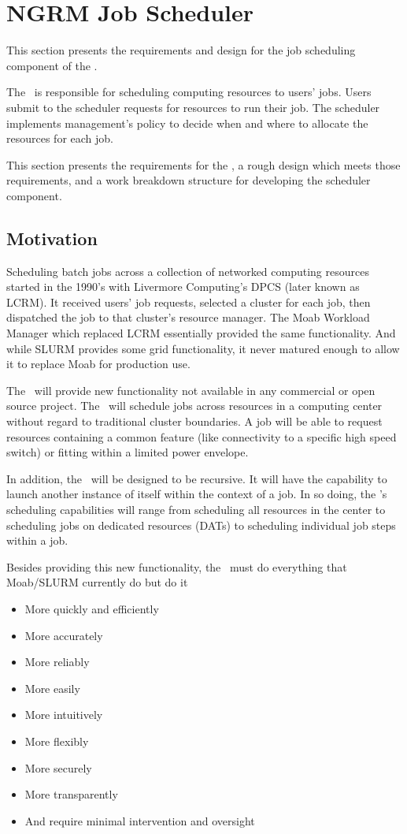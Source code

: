 \section{NGRM Job Scheduler}

This section presents the requirements and design for the job
scheduling component of the \ngrm.

The \ngjs\ is responsible for scheduling computing resources to users'
jobs.  Users submit to the scheduler requests for resources to run
their job.  The scheduler implements management's policy to decide
when and where to allocate the resources for each job.

This section presents the requirements for the \ngjs, a rough design
which meets those requirements, and a work breakdown structure for
developing the scheduler component.

\subsection{Motivation}

Scheduling batch jobs across a collection of networked computing
resources started in the 1990's with Livermore Computing's DPCS (later
known as LCRM).  It received users' job requests, selected a cluster
for each job, then dispatched the job to that cluster's resource
manager.  The Moab Workload Manager which replaced LCRM essentially
provided the same functionality.  And while SLURM provides some grid
functionality, it never matured enough to allow it to replace Moab for
production use.

The \ngjs\ will provide new functionality not available in any
commercial or open source project.  The \ngjs\ will schedule jobs
across resources in a computing center without regard to traditional
cluster boundaries.  A job will be able to request resources
containing a common feature (like connectivity to a specific high
speed switch) or fitting within a limited power envelope.

In addition, the \ngjs\ will be designed to be recursive.  It will
have the capability to launch another instance of itself within the
context of a job.  In so doing, the \ngjs's scheduling capabilities
will range from scheduling all resources in the center to scheduling
jobs on dedicated resources (DATs) to scheduling individual job steps
within a job.

Besides providing this new functionality, the \ngjs\ must do everything
that Moab/SLURM currently do but do it
\begin{itemize}
  \item More quickly and efficiently
  \item More accurately
  \item More reliably
  \item More easily
  \item More intuitively
  \item More flexibly
  \item More securely
  \item More transparently
  \item And require minimal intervention and oversight
\end{itemize}


